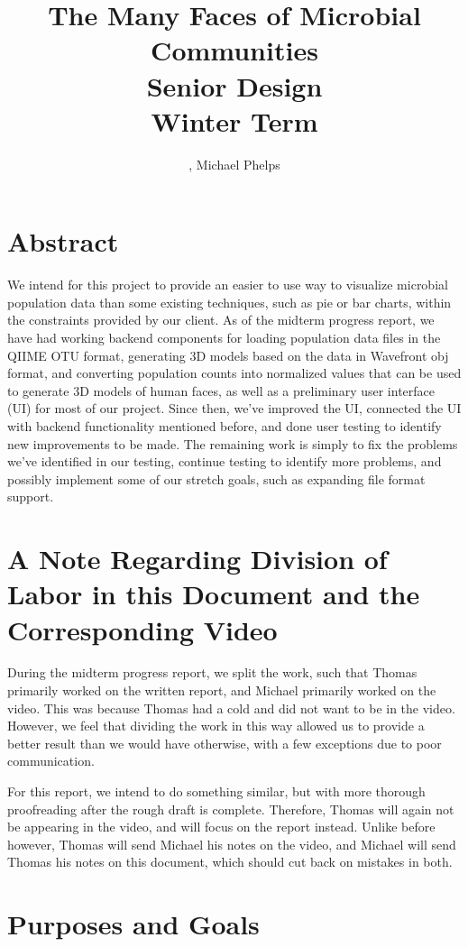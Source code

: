 \documentclass[letterpaper,10pt, onecolumn, draftclsnofoot]{IEEEtran}
\title{The Many Faces of Microbial Communities \\\large Senior Design\\Winter Term\\}
\author{\name, Michael Phelps}
\begin{document}
\maketitle
\section*{Abstract}
We intend for this project to provide an easier to use way to visualize microbial population data than some existing techniques, such as pie or bar charts, within the constraints provided by our client. As of the midterm progress report, we have had working backend components for loading population data files in the QIIME OTU format, generating 3D models based on the data in Wavefront obj format, and converting population counts into normalized values that can be used to generate 3D models of human faces, as well as a preliminary user interface (UI) for most of our project. Since then, we've improved the UI, connected the UI with backend functionality mentioned before, and done user testing to identify new improvements to be made. The remaining work is simply to fix the problems we've identified in our testing, continue testing to identify more problems, and possibly implement some of our stretch goals, such as expanding file format support.

\clearpage

\tableofcontents

\section{A Note Regarding Division of Labor in this Document and the Corresponding Video}
During the midterm progress report, we split the work, such that Thomas primarily worked on the written report, and Michael primarily worked on the video. This was because Thomas had a cold and did not want to be in the video. However, we feel that dividing the work in this way allowed us to provide a better result than we would have otherwise, with a few exceptions due to poor communication.

For this report, we intend to do something similar, but with more thorough proofreading after the rough draft is complete. Therefore, Thomas will again not be appearing in the video, and will focus on the report instead. Unlike before however, Thomas will send Michael his notes on the video, and Michael will send Thomas his notes on this document, which should cut back on mistakes in both.

\section{Purposes and Goals}
\end{document}
